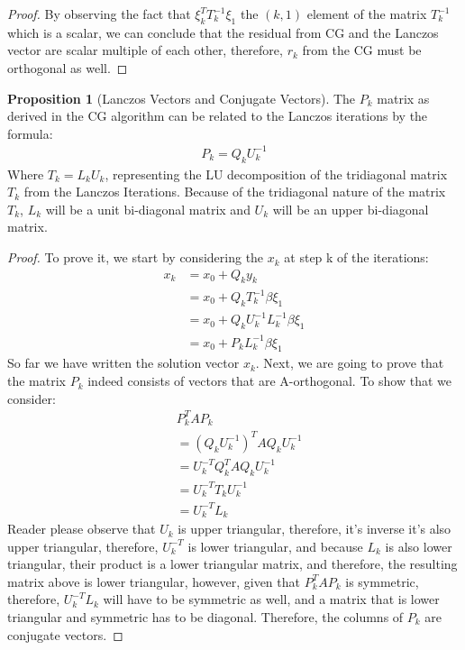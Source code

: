 \documentclass[]{article}
\theoremstyle{definition}
\newtheorem{prop}{Proposition}[section]  %
\begin{document}
\begin{proof}
                By observing the fact that $\xi^T_kT^{-1}_k\xi_1$ the $(k, 1)$ element of the matrix $T_k^{-1}$ which is a scalar, we can conclude that the residual from CG and the Lanczos vector are scalar multiple of each other, therefore, $r_k$ from the CG must be orthogonal as well. 
            \end{proof}
            \begin{prop}[Lanczos Vectors and Conjugate Vectors]
                The $P_k$ matrix as derived in the CG algorithm can be related to the Lanczos iterations by the formula: 
                \begin{align}
                    P_k = Q_k U_k^{-1}
                \end{align}
                Where $T_k = L_kU_k$, representing the LU decomposition of the tridiagonal matrix $T_k$ from the Lanczos Iterations. Because of the tridiagonal nature of the matrix $T_k$, $L_k$ will be a unit bi-diagonal matrix and $U_k$ will be an upper bi-diagonal matrix. 
            \end{prop}
            \begin{proof}
                To prove it, we start by considering the $x_k$ at step k of the iterations: 
                \begin{align}
                    x_k &= x_0 + Q_k y_k 
                    \\
                    &= x_0 + Q_k T_{k}^{-1} \beta \xi_1
                    \\
                    &= x_0 + Q_k U_k^{-1}L_k^{-1}\beta \xi_1
                    \\
                    &= x_0 + P_k L_k^{-1}\beta\xi_1
                \end{align}
                So far we have written the solution vector $x_k$. Next, we are going to prove that the matrix $P_k$ indeed consists of vectors that are A-orthogonal. To show that we consider: 
                \begin{align}
                    & P_k^TAP_k
                    \\
                    &= (Q_k U_k^{-1})^T AQ_kU_k^{-1}
                    \\
                    &= U_k^{-T}Q_k^{T}AQ_k U_k^{-1}
                    \\
                    &= U_k^{-T}T_kU_k^{-1}
                    \\
                    &= U^{-T}_kL_k
                \end{align}
                Reader please observe that $U_k$ is upper triangular, therefore, it's inverse it's also upper triangular, therefore, $U_k^{-T}$ is lower triangular, and because $L_k$ is also lower triangular, their product is a lower triangular matrix, and therefore, the resulting matrix above is lower triangular, however, given that $P_k^TAP_k$ is symmetric, therefore, $U_k^{-T}L_k$ will have to be symmetric as well, and a matrix that is lower triangular and symmetric has to be diagonal. Therefore, the columns of $P_k$ are conjugate vectors. 
            \end{proof}
\end{document}
